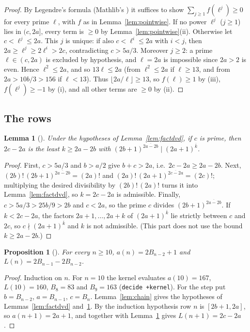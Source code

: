 \documentclass[11pt]{amsart}
\theoremstyle{plain}
\newtheorem{lemma}[theorem]{Lemma}
\newtheorem{proposition}[theorem]{Proposition}
\theoremstyle{definition}
\newcommand{\rf}[2]{#1^{\overline{#2}}}
\newcommand{\fl}[1]{\lfloor #1\rfloor}
\begin{document}
\begin{proof}
By Legendre's formula (Mathlib's ) it suffices to show $\sum_{j\ge1}f(\ell^j)\ge0$ for every prime $\ell$, with $f$ as in Lemma~\ref{lem:pointwise}. If no power $\ell^j$ ($j\ge1$) lies in $(c,2a]$, every term is $\ge0$ by Lemma~\ref{lem:pointwise}(ii). Otherwise let $c<\ell^j\le2a$. This $j$ is unique: if also $c<\ell^i\le2a$ with $i<j$, then $2a\ge\ell^j\ge2\ell^i>2c$, contradicting $c>5a/3$. Moreover $j\ge2$: a prime $\ell\in(c,2a)$ is excluded by hypothesis, and $\ell=2a$ is impossible since $2a>2$ is even. Hence $\ell^2\le2a$, and so $13\ell\le2a$ (from $\ell^2\le2a$ if $\ell\ge13$, and from $2a>10b/3>156$ if $\ell<13$). Thus $\fl{2a/\ell}\ge13$, so $f(\ell)\ge1$ by (iii), $f(\ell^j)\ge-1$ by (i), and all other terms are $\ge0$ by (ii).
\end{proof}

\subsection{The rows}

\begin{lemma}[]\label{lem:step}
Under the hypotheses of Lemma~\ref{lem:factdvd}, if $c$ is prime, then $2c-2a$ is the least $k\ge2a-2b$ with $\rf{(2b+1)}{2a-2b}\mid\rf{(2a+1)}{k}$.
\end{lemma}

\begin{proof}
First, $c>5a/3$ and $b>a/2$ give $b+c>2a$, i.e.\ $2c-2a\ge2a-2b$. Next, $(2b)!\,\rf{(2b+1)}{2a-2b}=(2a)!$ and $(2a)!\,\rf{(2a+1)}{2c-2a}=(2c)!$; multiplying the desired divisibility by $(2b)!\,(2a)!$ turns it into Lemma~\ref{lem:factdvd}, so $k=2c-2a$ is admissible. Finally, $c>5a/3>25b/9>2b$ and $c<2a$, so the prime $c$ divides $\rf{(2b+1)}{2a-2b}$. If $k<2c-2a$, the factors $2a+1,\dots,2a+k$ of $\rf{(2a+1)}{k}$ lie strictly between $c$ and $2c$, so $c\nmid\rf{(2a+1)}{k}$ and $k$ is not admissible. (This part does not use the bound $k\ge2a-2b$.)
\end{proof}

\begin{proposition}[]\label{prop:rows}
For every $n\ge10$, $a(n)=2B_{n-2}+1$ and $L(n)=2B_{n-1}-2B_{n-2}$.
\end{proposition}

\begin{proof}
Induction on $n$. For $n=10$ the kernel evaluates $a(10)=167$, $L(10)=160$, $B_8=83$ and $B_9=163$ (\texttt{decide +kernel}). For the step put $b=B_{n-2}$, $a=B_{n-1}$, $c=B_n$. Lemma~\ref{lem:chain} gives the hypotheses of Lemmas~\ref{lem:factdvd} and~\ref{lem:step}. By the induction hypothesis row $n$ is $[2b+1,2a]$, so $a(n+1)=2a+1$, and  together with Lemma~\ref{lem:step} gives $L(n+1)=2c-2a$.
\end{proof}
\end{document}
